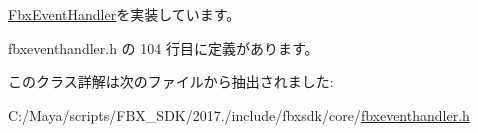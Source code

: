 \hyperlink{class_fbx_event_handler_a6d496102fe1253372bb042840c2d45a7}{Fbx\+Event\+Handler}を実装しています。



 fbxeventhandler.\+h の 104 行目に定義があります。



このクラス詳解は次のファイルから抽出されました\+:\begin{DoxyCompactItemize}
\item 
C\+:/\+Maya/scripts/\+F\+B\+X\+\_\+\+S\+D\+K/2017./include/fbxsdk/core/\hyperlink{fbxeventhandler_8h}{fbxeventhandler.\+h}\end{DoxyCompactItemize}
